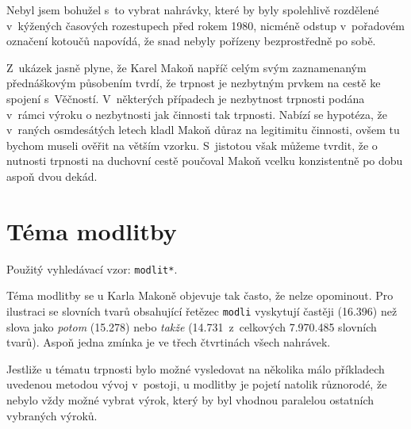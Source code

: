 Nebyl jsem bohužel s~to vybrat nahrávky, které by byly spolehlivě rozdělené
v~kýžených časových rozestupech před rokem 1980, nicméně odstup v~pořadovém
označení kotoučů napovídá, že snad nebyly pořízeny bezprostředně po sobě.

Z~ukázek jasně plyne, že Karel Makoň napříč celým svým zaznamenaným přednáškovým
působením tvrdí, že trpnost je nezbytným prvkem na cestě ke spojení s~Věčností.
V~některých případech je nezbytnost trpnosti podána v~rámci výroku o nezbytnosti
jak činnosti tak trpnosti. Nabízí se hypotéza, že v~raných osmdesátých letech
kladl Makoň důraz na legitimitu činnosti, ovšem tu bychom museli ověřit na
větším vzorku. S~jistotou však můžeme tvrdit, že o nutnosti trpnosti na duchovní
cestě poučoval Makoň vcelku konzistentně po dobu aspoň dvou dekád.

\section{Téma modlitby}

Použitý vyhledávací vzor: \texttt{modlit*}.

Téma modlitby se u Karla Makoně objevuje tak často, že nelze opominout. Pro
ilustraci se slovních tvarů obsahující řetězec \texttt{modli} vyskytují častěji
(16.396\texttimes) než slova jako \textit{potom} (15.278\texttimes) nebo
  \textit{takže} (14.731\texttimes~z~celkových 7.970.485 slovních tvarů). Aspoň
jedna zmínka je ve třech čtvrtinách všech nahrávek.

Jestliže u tématu trpnosti bylo možné vysledovat na několika málo příkladech
uvedenou metodou vývoj v~postoji, u modlitby je pojetí natolik různorodé, že
nebylo vždy možné vybrat výrok, který by byl vhodnou paralelou ostatních
vybraných výroků.

